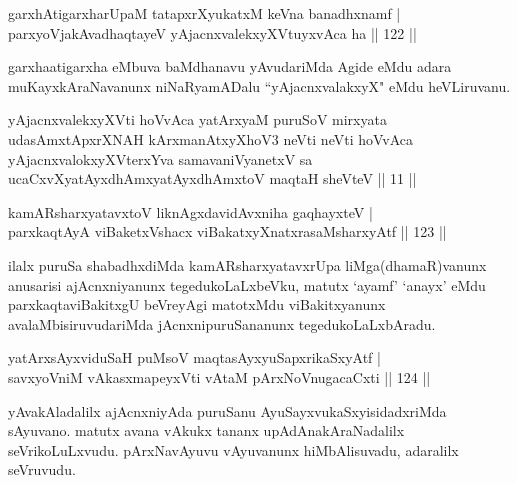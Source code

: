 
\begin{shl}
garxhAtigarxharUpaM tatapxrXyukatxM keVna banadhxnamf |\\
parxyoVjakAvadhaqtayeV yAjacnxvalekxyXVtuyxvAca ha \hfill || 122 ||
\end{shl}

\begin{artha}
garxhaatigarxha eMbuva baMdhanavu yAvudariMda Agide eMdu adara muKayxkAraNavanunx niNaRyamADalu ``yAjacnxvalakxyX" eMdu heVLiruvanu.
\end{artha}


\begin{kandikeshl}
yAjacnxvalekxyXVti hoVvAca yatArxyaM puruSoV mirxyata udasAmxtApxrXNAH kArxmanAtxyXhoV3 neVti neVti hoVvAca yAjacnxvalokxyXV\s terxYva samavaniVyanetxV sa ucaCxvXyatAyxdhAmxyatAyxdhAmxtoV maqtaH sheVteV || 11 ||
\end{kandikeshl}

\begin{shl}
kamARsharxyatavxtoV liknAgxdavidAvxniha gaqhayxteV |\\
parxkaqtAyA viBaketxVshacx viBakatxyXnatxrasaMsharxyAtf \hfill || 123 ||
\end{shl}

\begin{artha}
ilalx puruSa shabadhxdiMda kamARsharxyatavxrUpa liMga(dhamaR)vanunx anusarisi ajAcnxniyanunx tegedukoLaLxbeVku, matutx `ayamf' `anayx' eMdu parxkaqtaviBakitxgU beVreyAgi matotxMdu viBakitxyanunx avalaMbisiruvudariMda jAcnxnipuruSananunx tegedukoLaLxbAradu.
\end{artha}

\begin{shl}
yatArxsAyxviduSaH puMsoV maqtasAyx\s \s yuSapxrikaSxyAtf |\\
savxyoVniM vAkasxmapeyxVti vAtaM pArxNoV\s nugacaCxti \hfill || 124 ||
\end{shl}

\begin{artha}
yAvakAladalilx ajAcnxniyAda puruSanu AyuSayxvukaSxyisidadxriMda sAyuvano. matutx avana vAkukx tananx upAdAnakAraNadalilx seVrikoLuLxvudu. pArxNavAyuvu vAyuvanunx hiMbAlisuvadu, adaralilx seVruvudu.
\end{artha}


